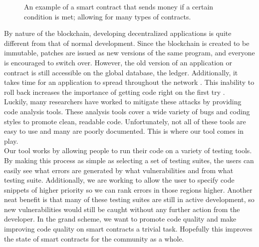 \begin{figure}[h!]
 
\label{code:example}
\caption{An example of a smart contract that sends money if a certain condition is met; allowing for many types of contracts.}
\end{figure}

By nature of the blockchain, developing decentralized applications is quite different from that of normal development. Since the blockchain is created to be immutable, patches are issued as new versions of the same program, and everyone is encouraged to switch over. However, the old version of an application or contract is still accessible on the global database, the ledger. Additionally, it takes time for an application to spread throughout the network \cite{luu2016making}. This inability to roll back increases the importance of getting code right on the first try \cite{luu2016making}. \\

Luckily, many researchers have worked to mitigate these attacks by providing code analysis tools. These analysis tools cover a wide variety of bugs and coding styles to promote clean, readable code\cite{atzei2017survey}. Unfortunately, not all of these tools are easy to use and many are poorly documented. This is where our tool comes in play. \\

Our tool works by allowing people to run their code on a variety of testing tools. By making this process as simple as selecting a set of testing suites, the users can easily see what errors are generated by what vulnerabilities and from what testing suite. Additionally, we are working to allow the user to specify code snippets of higher priority so we can rank errors in those regions higher. Another neat benefit is that many of these testing suites are still in active development, so new vulnerabilities would still be caught without any further action from the developer. In the grand scheme, we want to promote code quality and make improving code quality on smart contracts a trivial task. Hopefully this improves the state of smart contracts for the community as a whole. 
